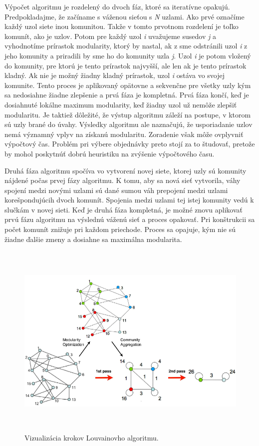 \documentclass[slovak,master,public,dept460,male,cpdeclaration,oneside]{diploma}
\begin{document}
Výpočet algoritmu je rozdelený do dvoch fáz, ktoré sa iteratívne opakujú. Predpokladajme, že začíname s váženou sieťou s \textit{N} uzlami. Ako prvé označíme každý uzol siete inou komunitou. Takže v tomto prvotnom rozdelení je toľko komunít, ako je uzlov. Potom pre každý uzol \textit{i} uvažujeme susedov \textit{j} a vyhodnotíme prírastok modularity, ktorý by nastal, ak z sme odstránili uzol \textit{i} z jeho komunity a priradili by sme ho do komunity uzla \textit{j}. Uzol \textit{i} je potom vložený do komunity, pre ktorú je tento prírastok najvyšší, ale len ak je tento prírastok kladný. Ak nie je možný žiadny kladný prírastok, uzol \textit{i} ostáva vo svojej komunite. Tento proces je aplikovaný opätovne a sekvenčne pre všetky uzly kým sa nedosiahne žiadne zlepšenie a prvá fáza je kompletná. Prvá fáza končí, keď je dosiahnuté lokálne maximum modularity, keď žiadny uzol už nemôže zlepšiť modularitu. Je taktiež dôležité, že výstup algoritmu záleží na postupe, v ktorom sú uzly brané do úvahy. Výsledky algoritmu ale naznačujú, že usporiadanie uzlov nemá významný vplyv na získanú modularitu. Zoradenie však môže ovplyvniť výpočtový čas. Problém pri výbere objednávky preto stojí za to študovať, pretože by mohol poskytnúť dobrú heuristiku na zvýšenie výpočtového času.


Druhá fáza algoritmu spočíva vo vytvorení novej siete, ktorej uzly sú komunity nájdené počas prvej fázy algoritmu. K tomu, aby sa nová sieť vytvorila, váhy spojení medzi novými uzlami sú dané sumou váh prepojení medzi uzlami korešpondujúcih dvoch komunít. Spojenia medzi uzlami tej istej komunity vedú k slučkám v novej sieti. Keď je druhá fáza kompletná, je možné znovu aplikovať prvú fázu algoritmu na výslednú váženú sieť a proces opakovať. Pri konštrukcii sa počet komunít znižuje pri každom priechode. Proces sa opajuje, kým nie sú žiadne ďalšie zmeny a dosiahne sa maximálna modularita.


\begin{figure}[H]
\centering
\includegraphics[width=14.5cm, height=9.5cm]{figures/louvain}
\caption{Vizualizácia krokov Louvainovho algoritmu. }
\end{figure}
\end{document}
